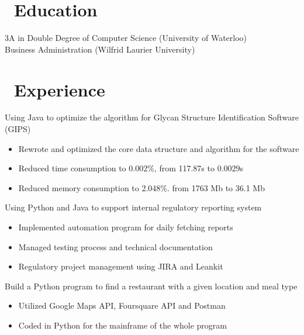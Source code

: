 \documentclass{resume}
\begin{document}



\section{\faGraduationCap\ Education}
3A in Double Degree of Computer Science (University of Waterloo) \\
Business Administration (Wilfrid Laurier University) 

\section{\faUsers\ Experience}
Using Java to optimize the algorithm for Glycan Structure Identification Software (GIPS)
\begin{itemize}
  \item Rewrote and optimized the core data structure and algorithm for the software 
  \item Reduced time consumption to 0.002\%, from 117.87s to 0.0029s
  \item Reduced memory consumption to 2.048\%. from 1763 Mb to 36.1 Mb
\end{itemize}

Using Python and Java to support  internal regulatory reporting system 
\begin{itemize}
  \item Implemented automation program for daily fetching reports
  \item Managed testing process and technical documentation
  \item Regulatory project management using JIRA and Leankit
\end{itemize}

Build a Python program to find a restaurant with a given location and meal type
\begin{itemize}
  \item Utilized Google Maps API, Foursquare API and Postman
  \item Coded in Python for the mainframe of the whole program
\end{itemize}
\end{document}

